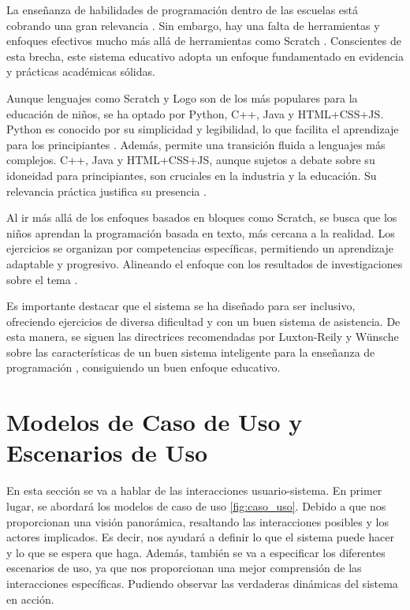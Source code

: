 La enseñanza de habilidades de programación dentro de las escuelas está cobrando una gran relevancia \cite{teachingcodingchildren}. Sin embargo, hay una falta de herramientas y enfoques efectivos mucho más allá de herramientas como Scratch \cite{teachingcodingchildren}. Conscientes de esta brecha, este sistema educativo adopta un enfoque fundamentado en evidencia y prácticas académicas sólidas.

Aunque lenguajes como Scratch y Logo son de los más populares para la educación de niños, se ha optado por Python, C++, Java y HTML+CSS+JS. Python es conocido por su simplicidad y legibilidad, lo que facilita el aprendizaje para los principiantes \cite{pears2007}. Además, permite una transición fluida a lenguajes más complejos. C++, Java y HTML+CSS+JS, aunque sujetos a debate sobre su idoneidad para principiantes, son cruciales en la industria y la educación. Su relevancia práctica justifica su presencia \cite{dewarschonberg}.

Al ir más allá de los enfoques basados en bloques como Scratch, se busca que los niños aprendan la programación basada en texto, más cercana a la realidad. Los ejercicios se organizan por competencias específicas, permitiendo un aprendizaje adaptable y progresivo. Alineando el enfoque con los resultados de investigaciones sobre el tema \cite{document2010}. 

Es importante destacar que el sistema se ha diseñado para ser inclusivo, ofreciendo ejercicios de diversa dificultad y con un buen sistema de asistencia. De esta manera, se siguen las directrices recomendadas por Luxton-Reily y Wünsche sobre las características de un buen sistema inteligente para la enseñanza de programación \cite{intelligentturoingprogrammingeducation}, consiguiendo un buen enfoque educativo.

\section{Modelos de Caso de Uso y Escenarios de Uso}

En esta sección se va a hablar de las interacciones usuario-sistema. En primer lugar, se abordará los modelos de caso de uso \ref{fig:caso_uso}. Debido a que nos proporcionan una visión panorámica, resaltando las interacciones posibles y los actores implicados. Es decir, nos ayudará a definir lo que el sistema puede hacer y lo que se espera que haga. Además, también se va a especificar los diferentes escenarios de uso, ya que nos proporcionan una mejor comprensión de las interacciones específicas. Pudiendo observar las verdaderas dinámicas del sistema en acción.

